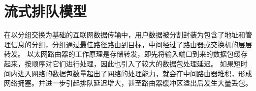 %
%


\section{流式排队模型}
在以分组交换为基础的互联网数据传输中，用户数据被分割封装为包含了地址和管理信息的分组，分组通过最佳路径路由到目标，中间经过了路由器或交换机的层层转发。
以太网路由器的工作原理是存储转发，即先将输入端口到来的数据包缓存起来，按顺序对它们进行处理，因此也引入了较大的数据包处理延迟。
如果短时间内进入网络的数据包数量超出了网络的处理能力，就会在中间路由器堆积，形成网络拥塞。并进一步引起排队延迟增大，甚至路由器缓冲区溢出后发生大量丢包。

